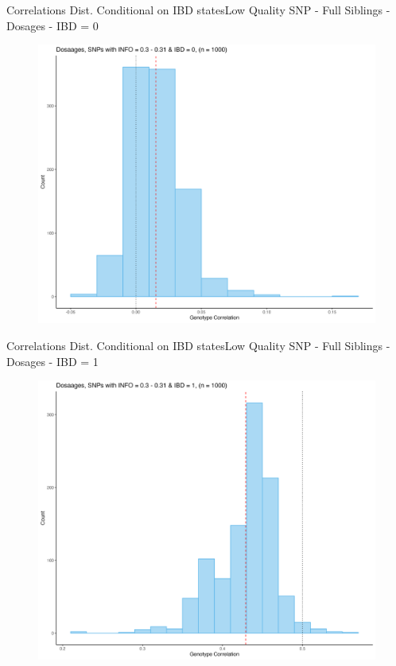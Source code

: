 \documentclass{beamer}
\begin{document}
\begin{frame}{Correlations Dist. Conditional on IBD states}{Low Quality SNP - Full Siblings - Dosages - IBD = 0}

\begin{figure}

      \includegraphics[width= .85\textwidth]{fig/DS-0-i30.png}
      
\end{figure}

\end{frame}

\begin{frame}{Correlations Dist. Conditional on IBD states}{Low Quality SNP - Full Siblings - Dosages - IBD = 1}

\begin{figure}

      \includegraphics[width= .85\textwidth]{fig/DS-1-i30.png}
      
\end{figure}

\end{frame}
\end{document}
